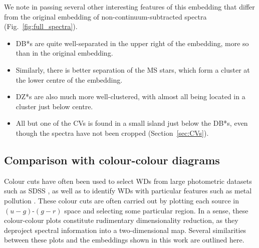 \documentclass[fleqn,usenatbib]{mnras}
\begin{document}
We note in passing several other interesting features of this embedding that differ from the original embedding of non-continuum-subtracted spectra (Fig.~\ref{fig:full_spectra}).
\begin{itemize}
\item
DB*s are quite well-separated in the upper right of the embedding, more so than in the original embedding.
\item
Similarly, there is better separation of the MS stars, which form a cluster at the lower centre of the embedding.
\item
DZ*s are also much more well-clustered, with almost all being located in a cluster just below centre.
\item
All but one of the CVs is found in a small island just below the DB*s, even though the spectra have not been cropped (Section~\ref{sec:CVs}).
\end{itemize}

\subsection{Comparison with colour-colour diagrams}
\label{sec:colourcolour}

Colour cuts have often been used to select WDs from large photometric datasets such as SDSS \citep{eisenstein06, gentilefusillo15}, as well as to identify WDs with particular features such as metal pollution \citep{hollands15}.
These colour cuts are often carried out by plotting each source in $(u-g)$-$(g-r)$ space and selecting some particular region.
In a sense, these colour-colour plots constitute rudimentary dimensionality reduction, as they deproject spectral information into a two-dimensional map.
Several similarities between these plots and the embeddings shown in this work are outlined here.
\end{document}
